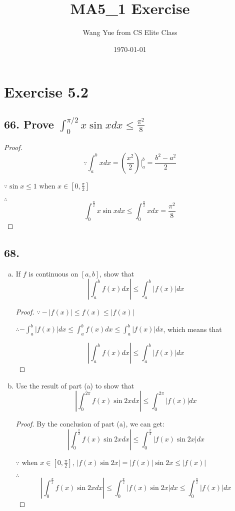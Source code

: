 \documentclass{article}
\begin{document}
    \title{MA5\_1 Exercise}
    \author{Wang Yue from CS Elite Class}
    \date{\today}

    \maketitle

    \section*{Exercise 5.2}

    \subsection*{66. Prove $\int_{0}^{\pi / 2} x \sin x dx \leq \frac{\pi ^2}{8}$}

    \begin{proof}
        $$\because \int_a^b xdx = (\frac{x^2}{2}) \biggl |_a^b = \frac{b^2 - a^2}{2}$$

        $\because \sin x \leq 1 $ when $x \in [0, \frac \pi 2]$

        $\therefore$ $$\int_{0}^{\frac \pi 2} x \sin x dx \leq \int_{0}^{\frac \pi 2} xdx = \frac{\pi^2}{8}$$
    \end{proof}

    \subsection*{68.}

    \begin{enumerate}[(a)]
        \item If $f$ is continuous on $[a, b]$, show that $$|\int_{a}^{b}f(x)dx| \leq \int_{a}^{b}|f(x)|dx$$

        \begin{proof}
            $\because -|f(x)| \leq f(x) \leq |f(x)|$

            $\therefore -\int_{a}^{b}|f(x)|dx \leq \int_{a}^{b}f(x)dx \leq \int_{a}^{b}|f(x)|dx$, which means that

            $$|\int_{a}^{b}f(x)dx| \leq \int_{a}^{b}|f(x)|dx$$
        \end{proof}

        \item Use the result of part (a) to show that $$|\int_{0}^{2\pi} f(x) \sin 2x dx| \leq \int_{0}^{2\pi}|f(x)|dx$$

        \begin{proof}
            By the conclusion of part (a), we can get: $$|\int_{0}^{\frac \pi 2}f(x)\sin 2x dx| \leq \int_{0}^{\frac \pi 2}|f(x) \sin 2x| dx$$

            $\because $ when $x \in [0, \frac \pi 2]$, $| f(x)\sin 2x | = |f(x)| \sin 2x \leq |f(x)|$

            $\therefore$ $$|\int_{0}^{\frac \pi 2}f(x)\sin 2x dx| \leq \int_{0}^{\frac \pi 2}|f(x) \sin 2x| dx \leq \int_{0}^{\frac \pi 2}|f(x)| dx$$
        \end{proof}
    \end{enumerate}
\end{document}
